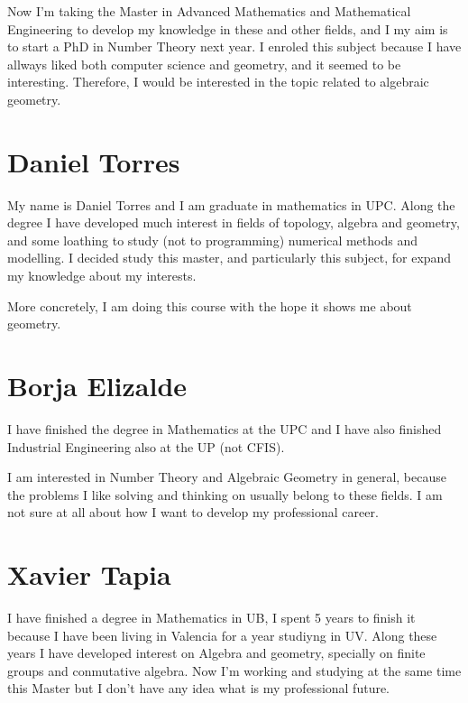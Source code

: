 Now I'm taking the Master in Advanced Mathematics and Mathematical Engineering to develop my knowledge in these and other fields, and I my aim is to start a PhD in Number Theory next year. I enroled this subject because I have allways liked both computer science and geometry, and it seemed to be interesting. Therefore, I would be interested in the topic related to algebraic geometry.

\section{Daniel Torres}

My name is Daniel Torres and I am graduate in mathematics in UPC. Along the degree I have developed much interest in fields of topology, algebra and geometry, and some loathing to study (not to programming) numerical methods and modelling. I decided study this master, and particularly this subject, for expand my knowledge about my interests.

More concretely, I am doing this course with the hope it shows me about geometry.

\section{Borja Elizalde}
I have finished the degree in Mathematics at the UPC and I have also finished Industrial Engineering also at the UP (not CFIS).

I am interested in Number Theory and Algebraic Geometry in general, because the problems I like solving and thinking on usually belong to these fields. I am not sure at all about how I want to develop my professional career.

\section{Xavier Tapia}
I have finished a degree in Mathematics in UB, I spent 5 years to finish it because I have been living in Valencia for a year studiyng in UV. Along these years I have developed interest on Algebra and geometry, specially on finite groups and conmutative algebra. Now I'm working and studying at the same time this Master but I don't have any idea what is my professional future.

